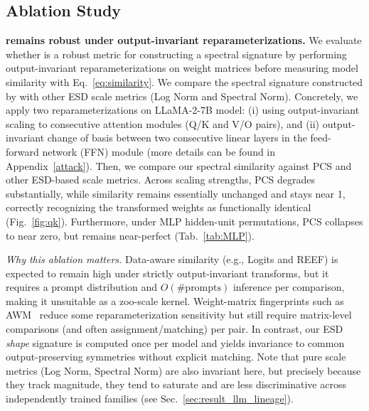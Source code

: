 \subsection{Ablation Study}\label{sec:ablation}

\textbf{\ALPHAHILL remains robust under output-invariant reparameterizations.}
We evaluate whether \ALPHAHILL is a robust metric for constructing a spectral signature by performing output-invariant reparameterizations on weight matrices before measuring model similarity with Eq.~\ref{eq:similarity}. We compare the spectral signature constructed by \ALPHAHILL with other ESD scale metrics (Log Norm and Spectral Norm). Concretely, we apply two reparameterizations on LLaMA-2-7B model: (i) using output-invariant scaling to consecutive attention modules (Q/K and V/O pairs), and (ii) output-invariant change of basis between two consecutive linear layers in the feed-forward network (FFN) module (more details can be found in Appendix~\ref{attack}).
%
Then, we compare our spectral similarity against PCS and other ESD-based scale metrics. Across scaling strengths, PCS degrades substantially, while \ALPHAHILL similarity remains essentially unchanged and stays near 1, correctly recognizing the transformed weights as functionally identical (Fig.~\ref{fig:qk}). Furthermore, under MLP hidden-unit permutations, PCS collapses to near zero, but \ALPHAHILL remains near-perfect (Tab.~\ref{tab:MLP}).

\emph{Why this ablation matters.} Data-aware similarity (e.g., Logits and REEF) is expected to remain high under strictly output-invariant transforms, but it requires a prompt distribution and $O(\#\text{prompts})$ inference per comparison, making it unsuitable as a zoo-scale kernel. Weight-matrix fingerprints such as \textsc{AWM}~\cite{zeng2025awm} reduce some reparameterization sensitivity but still require matrix-level comparisons (and often assignment/matching) per pair. In contrast, our ESD \emph{shape} signature is computed once per model and yields invariance to common output-preserving symmetries without explicit matching. Note that pure scale metrics (Log Norm, Spectral Norm) are also invariant here, but precisely because they track magnitude, they tend to saturate and are less discriminative across independently trained families (see Sec.~\ref{sec:result_llm_lineage}).

